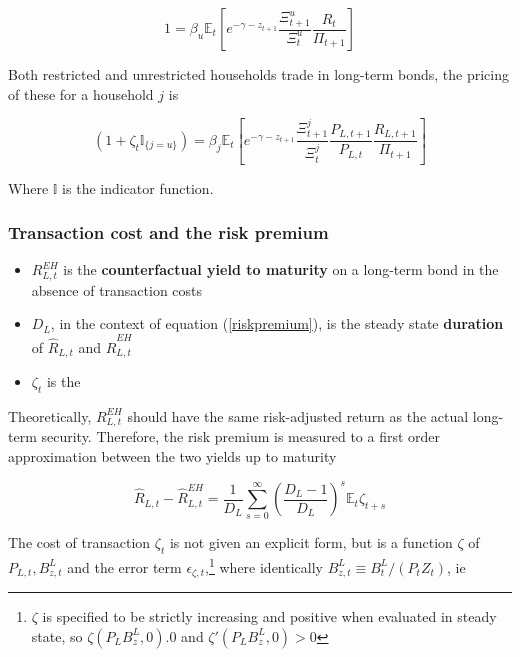 \documentclass[notitlepage,12pt]{report}
\begin{document}
\begin{appendices}
	\begin{equation}
	1=\beta_u\mathbb{E}_t\left[e^{-\gamma-z_{t+1}}\frac{\Xi_{t+1}^u}{\Xi_t^u}\frac{R_t}{\Pi_{t+1}}\right]
	\end{equation}
	
	Both restricted and unrestricted households trade in long-term bonds, the pricing of these for a household \(j\) is
	
	\begin{equation}
	(1+\zeta_t\mathbb{I}_{\{j=u\}})=\beta_j\mathbb{E}_t\left[e^{-\gamma-z_{t+1}}\frac{\Xi_{t+1}^j}{\Xi_t^j}\frac{P_{L,t+1}}{P_{L,t}}\frac{R_{L,t+1}}{\Pi_{t+1}}\right]
	\end{equation}
	
	Where \(\mathbb{I}\) is the indicator function.
	
	\subsubsection{Transaction cost and the risk premium}
	
	\begin{itemize}
		\item \(R_{L,t}^{E H}\) is the {\bf counterfactual yield to maturity} on a long-term bond in the absence of transaction costs
		\item \(D_L\), in the context of equation (\ref{riskpremium}), is the steady state {\bf duration} of \(\hat{R}_{L,t}\) and \(\hat{R}_{L,t}^{EH}\)
		\item \(\zeta_t\) is the 
	\end{itemize}
	
	Theoretically, \(R_{L,t}^{EH}\) should have the same risk-adjusted return as the actual long-term security. Therefore, the risk premium is measured to a first order approximation between the two yields up to maturity
	
	\begin{equation}\label{riskpremium}
	\hat{R}_{L,t}-\hat{R}_{L,t}^{EH}=\frac{1}{D_L}\sum_{s=0}^\infty\left(\frac{D_L-1}{D_L}\right)^s\mathbb{E}_t\zeta_{t+s}
	\end{equation}
	
	The cost of transaction \(\zeta_t\) is not given an explicit form, but is a function \(\zeta\) of \(P_{L,t},B_{z,t}^L\) and the error term \(\epsilon_{\zeta,t}\),\footnote{\(\zeta\) is specified to be strictly increasing and positive when evaluated in steady state, so \(\zeta(P_LB_z^L,0).0\) and \(\zeta'(P_LB_z^L,0)>0\)} where identically \(B_{z,t}^L\equiv B_t^L/(P_tZ_t)\), ie
	

\end{appendices}
\end{document}
